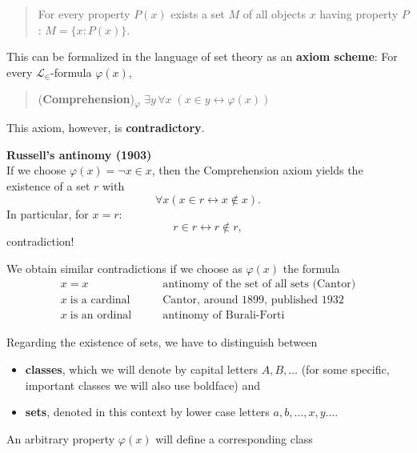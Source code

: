 \documentclass{article}
\begin{document}
\begin{quote}
For every property $P(x)$ exists a set $M$ of all objects $x$ having property $P$:  $M =\{x: P(x) \}$.
\end{quote}

This can be formalized in the language of set theory as an \textbf{axiom scheme}: For every $\mathcal{L}_\in$-formula $\varphi(x)$,

\begin{quote}
(\textbf{Comprehension})\textsubscript{$\varphi$} $\exists y \, \forall x \; ( x \in y \leftrightarrow \varphi(x))$
\end{quote}

This axiom, however, is \textbf{contradictory}.

\begin{framed}
\textbf{Russell's antinomy (1903)}\\
If we choose $\varphi(x) = \neg x \in x$, then the Comprehension axiom yields the existence of a set $r$ with
\begin{equation*}
\forall x ( x \in  r \leftrightarrow x \not \in x).
\end{equation*}
In particular, for $x = r$:
\begin{equation*}
r \in  r \leftrightarrow r \not \in r ,
\end{equation*}
contradiction!
\end{framed}

We obtain similar contradictions if we choose as $\varphi(x)$ the formula
\begin{align*}
     x = x  \qquad &  \text{antinomy of the set of all sets (Cantor)} \\
     x\;\text{is a cardinal} \qquad & \text{Cantor, around 1899, published 1932}\\
     x \; \text{is an ordinal} \qquad &   \text{antinomy of Burali-Forti}
\end{align*}

Regarding the existence of sets, we have to distinguish between

\begin{itemize}
\item \textbf{classes}, which we will denote by capital letters $A,B,\dots$ (for some specific, important classes we will also use boldface) and
\item \textbf{sets}, denoted in this context by lower case letters $a,b,\ldots,x,y \ldots$.
\end{itemize}

An arbitrary property $\varphi(x)$ will define a corresponding class
\end{document}
